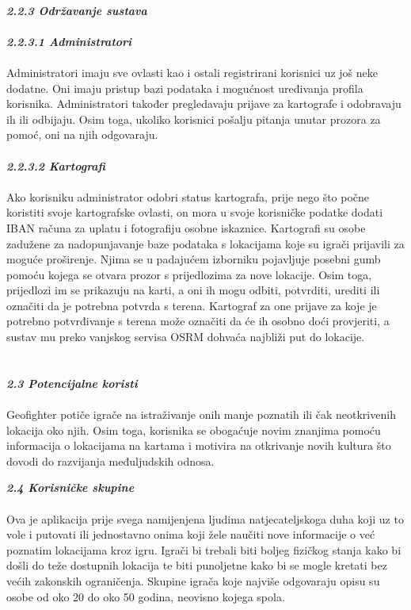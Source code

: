 		
		\textbf{\textit{\\2.2.3 Održavanje sustava}}\\ \\ 
		\textbf{\textit{\small2.2.3.1 Administratori}}\\ \\
		{Administratori imaju sve ovlasti kao i ostali registrirani korisnici uz još neke dodatne. Oni imaju pristup bazi podataka i mogućnost uređivanja profila korisnika. Administratori također pregledavaju prijave za kartografe i odobravaju ih ili odbijaju. Osim toga, ukoliko korisnici pošalju pitanja unutar prozora za pomoć, oni na njih odgovaraju.}\\
		
		\textbf{\textit{\\ \small2.2.3.2 Kartografi}}\\ \\
		{Ako korisniku administrator odobri status kartografa, prije nego što počne koristiti svoje kartografske ovlasti, on mora u svoje korisničke podatke dodati IBAN računa za uplatu i fotografiju osobne iskaznice. Kartografi su osobe zadužene za nadopunjavanje baze podataka s lokacijama koje su igrači prijavili za moguće proširenje. Njima se u padajućem izborniku pojavljuje posebni gumb pomoću kojega se otvara prozor s prijedlozima za nove lokacije. Osim toga, prijedlozi im se prikazuju na karti, a oni ih mogu odbiti, potvrditi, urediti ili označiti da je potrebna potvrda s terena. Kartograf za one prijave za koje je potrebno potvrđivanje s terena može označiti da će ih osobno doći provjeriti, a sustav mu preko vanjskog servisa OSRM dohvaća najbliži put do lokacije.}
		\\ \\ \\ 
		
		\textbf{\textit{\large 2.3 Potencijalne koristi}}\\ \\ 
		{Geofighter potiče igrače na istraživanje onih manje poznatih ili čak neotkrivenih lokacija oko njih. Osim toga, korisnika se obogaćuje novim znanjima pomoću informacija o lokacijama na kartama i motivira na otkrivanje novih kultura što dovodi do razvijanja međuljudskih odnosa.} \newpage
		
		\textbf{\textit{\large 2.4 Korisničke skupine}}\\ \\ 
		{Ova je aplikacija prije svega namijenjena ljudima natjecateljskoga duha koji uz to vole i putovati ili jednostavno onima koji žele naučiti nove informacije o već poznatim lokacijama kroz igru. Igrači bi trebali biti boljeg fizičkog stanja kako bi došli do teže dostupnih lokacija te biti punoljetne kako bi se mogle kretati bez većih zakonskih ograničenja. Skupine igrača koje najviše odgovaraju opisu su osobe od oko 20 do oko 50 godina, neovisno kojega spola.}\\ \\
		
